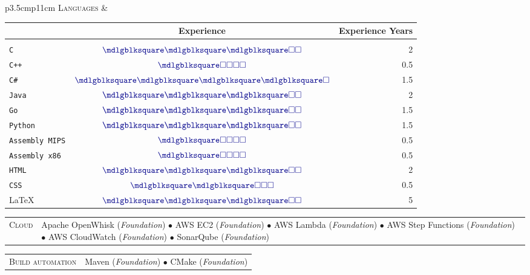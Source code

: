 \documentclass[english,10pt,a4paper]{article}
\newcommand{\BasicLevel}{{\footnotesize (\textit{Foundation})}}
\newcommand{\CvBullet}{\hspace{0.05cm} $\bullet$ \hspace{0.05cm}}
\newcommand{\CvDate}[1]{\textcolor{CvColor}{{\textsc{#1}}}}
\newcommand{\FullBlock}{\textcolor{CvColor}{\mdlgblksquare}}
\newcommand{\EmptyBlock}{\textcolor{CvColor}{\square}}
\def\SidebarHSize{3.5cm}
\def\BodyHSize{11cm}
\begin{document}
	\begin{longtable}{p{\SidebarHSize}p{\BodyHSize}}
		\CvDate{Languages} &  \begin{tabular}{lcr}
			\centering
			& \textbf{Experience} & \textbf{Experience Years} \\
			\hline
			&& \\
			\texttt{C} & $\FullBlock\FullBlock\FullBlock\EmptyBlock\EmptyBlock$ & 2 \\
			\texttt{C++} & $\FullBlock\EmptyBlock\EmptyBlock\EmptyBlock\EmptyBlock$ & 0.5 \\
			\texttt{C\#} & $\FullBlock\FullBlock\FullBlock\FullBlock\EmptyBlock$ & 1.5 \\
			\texttt{Java} & $\FullBlock\FullBlock\FullBlock\EmptyBlock\EmptyBlock$ & 2 \\
			\texttt{Go} & $\FullBlock\FullBlock\FullBlock\EmptyBlock\EmptyBlock$ & 1.5 \\
			\texttt{Python} & $\FullBlock\FullBlock\FullBlock\EmptyBlock\EmptyBlock$ & 1.5 \\
			\texttt{Assembly MIPS} & $\FullBlock\EmptyBlock\EmptyBlock\EmptyBlock\EmptyBlock$ & 0.5 \\
			\texttt{Assembly x86} & $\FullBlock\EmptyBlock\EmptyBlock\EmptyBlock\EmptyBlock$ & 0.5 \\
			\texttt{HTML} & $\FullBlock\FullBlock\FullBlock\EmptyBlock\EmptyBlock$ & 2 \\
			\texttt{CSS} & $\FullBlock\FullBlock\EmptyBlock\EmptyBlock\EmptyBlock$ & 0.5 \\
			\LaTeX & $\FullBlock\FullBlock\FullBlock\EmptyBlock\EmptyBlock$ & 5 \\
		\end{tabular}
	\end{longtable}
	
	
	\begin{longtable}{p{\SidebarHSize}p{\BodyHSize}}
		\CvDate{Cloud} & Apache OpenWhisk \BasicLevel \CvBullet AWS EC2 \BasicLevel \CvBullet AWS Lambda  \BasicLevel \CvBullet AWS Step Functions \BasicLevel \CvBullet AWS CloudWatch \BasicLevel \CvBullet SonarQube \BasicLevel
	\end{longtable}
		
	\begin{longtable}{p{\SidebarHSize}p{\BodyHSize}}
		\CvDate{Build automation} & Maven \BasicLevel \CvBullet CMake \BasicLevel
	\end{longtable}
		
\end{document}

